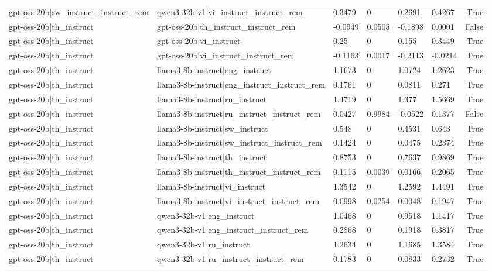 \begin{table}
\begin{tabular}{llllllr}
gpt-oss-20b|sw_instruct_instruct_rem & qwen3-32b-v1|vi_instruct_instruct_rem & 0.3479 & 0 & 0.2691 & 0.4267 & True \\
gpt-oss-20b|th_instruct & gpt-oss-20b|th_instruct_instruct_rem & -0.0949 & 0.0505 & -0.1898 & 0.0001 & False \\
gpt-oss-20b|th_instruct & gpt-oss-20b|vi_instruct & 0.25 & 0 & 0.155 & 0.3449 & True \\
gpt-oss-20b|th_instruct & gpt-oss-20b|vi_instruct_instruct_rem & -0.1163 & 0.0017 & -0.2113 & -0.0214 & True \\
gpt-oss-20b|th_instruct & llama3-8b-instruct|eng_instruct & 1.1673 & 0 & 1.0724 & 1.2623 & True \\
gpt-oss-20b|th_instruct & llama3-8b-instruct|eng_instruct_instruct_rem & 0.1761 & 0 & 0.0811 & 0.271 & True \\
gpt-oss-20b|th_instruct & llama3-8b-instruct|ru_instruct & 1.4719 & 0 & 1.377 & 1.5669 & True \\
gpt-oss-20b|th_instruct & llama3-8b-instruct|ru_instruct_instruct_rem & 0.0427 & 0.9984 & -0.0522 & 0.1377 & False \\
gpt-oss-20b|th_instruct & llama3-8b-instruct|sw_instruct & 0.548 & 0 & 0.4531 & 0.643 & True \\
gpt-oss-20b|th_instruct & llama3-8b-instruct|sw_instruct_instruct_rem & 0.1424 & 0 & 0.0475 & 0.2374 & True \\
gpt-oss-20b|th_instruct & llama3-8b-instruct|th_instruct & 0.8753 & 0 & 0.7637 & 0.9869 & True \\
gpt-oss-20b|th_instruct & llama3-8b-instruct|th_instruct_instruct_rem & 0.1115 & 0.0039 & 0.0166 & 0.2065 & True \\
gpt-oss-20b|th_instruct & llama3-8b-instruct|vi_instruct & 1.3542 & 0 & 1.2592 & 1.4491 & True \\
gpt-oss-20b|th_instruct & llama3-8b-instruct|vi_instruct_instruct_rem & 0.0998 & 0.0254 & 0.0048 & 0.1947 & True \\
gpt-oss-20b|th_instruct & qwen3-32b-v1|eng_instruct & 1.0468 & 0 & 0.9518 & 1.1417 & True \\
gpt-oss-20b|th_instruct & qwen3-32b-v1|eng_instruct_instruct_rem & 0.2868 & 0 & 0.1918 & 0.3817 & True \\
gpt-oss-20b|th_instruct & qwen3-32b-v1|ru_instruct & 1.2634 & 0 & 1.1685 & 1.3584 & True \\
gpt-oss-20b|th_instruct & qwen3-32b-v1|ru_instruct_instruct_rem & 0.1783 & 0 & 0.0833 & 0.2732 & True \\

\end{tabular}
\end{table}
